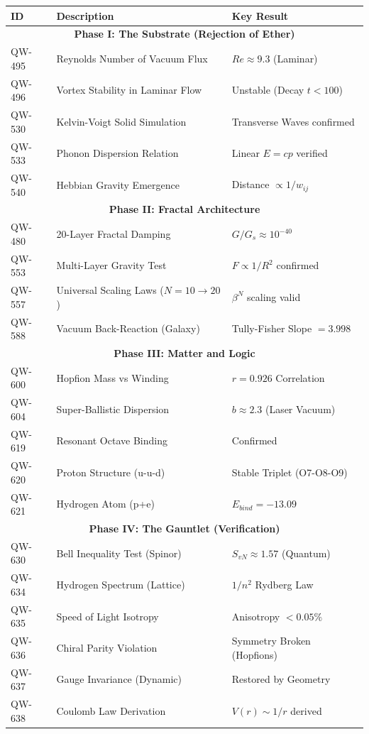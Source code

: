 \documentclass[11pt, a4paper]{report}
\begin{document}
\begin{small}
\begin{longtable}{|p{2cm}|p{8cm}|p{4cm}|}
\hline
\textbf{ID} & \textbf{Description} & \textbf{Key Result} \\
\hline
\endhead
\hline
\multicolumn{3}{|c|}{\textbf{Phase I: The Substrate (Rejection of Ether)}} \\
\hline
QW-495 & Reynolds Number of Vacuum Flux & $Re \approx 9.3$ (Laminar) \\
QW-496 & Vortex Stability in Laminar Flow & Unstable (Decay $t < 100$) \\
QW-530 & Kelvin-Voigt Solid Simulation & Transverse Waves confirmed \\
QW-533 & Phonon Dispersion Relation & Linear $E=cp$ verified \\
QW-540 & Hebbian Gravity Emergence & Distance $\propto 1/w_{ij}$ \\
\hline
\multicolumn{3}{|c|}{\textbf{Phase II: Fractal Architecture}} \\
\hline
QW-480 & 20-Layer Fractal Damping & $G/G_s \approx 10^{-40}$ \\
QW-553 & Multi-Layer Gravity Test & $F \propto 1/R^2$ confirmed \\
QW-557 & Universal Scaling Laws ($N=10 \to 20$) & $\beta^N$ scaling valid \\
QW-588 & Vacuum Back-Reaction (Galaxy) & Tully-Fisher Slope $= 3.998$ \\
\hline
\multicolumn{3}{|c|}{\textbf{Phase III: Matter and Logic}} \\
\hline
QW-600 & Hopfion Mass vs Winding & $r = 0.926$ Correlation \\
QW-604 & Super-Ballistic Dispersion & $b \approx 2.3$ (Laser Vacuum) \\
QW-619 & Resonant Octave Binding & Confirmed \\
QW-620 & Proton Structure (u-u-d) & Stable Triplet (O7-O8-O9) \\
QW-621 & Hydrogen Atom (p+e) & $E_{bind} = -13.09$ \\
\hline
\multicolumn{3}{|c|}{\textbf{Phase IV: The Gauntlet (Verification)}} \\
\hline
QW-630 & Bell Inequality Test (Spinor) & $S_{vN} \approx 1.57$ (Quantum) \\
QW-634 & Hydrogen Spectrum (Lattice) & $1/n^2$ Rydberg Law \\
QW-635 & Speed of Light Isotropy & Anisotropy $< 0.05\%$ \\
QW-636 & Chiral Parity Violation & Symmetry Broken (Hopfions) \\
QW-637 & Gauge Invariance (Dynamic) & Restored by Geometry \\
QW-638 & Coulomb Law Derivation & $V(r) \sim 1/r$ derived \\
\hline
\end{longtable}
\end{small}
\end{document}
